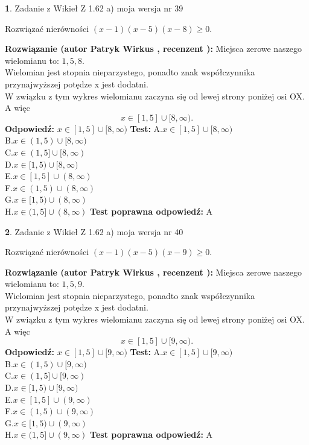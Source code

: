 \documentclass[12pt, a4paper]{article}
\theoremstyle{definition} %
\newtheorem{zad}{}
\newcommand{\zadStart}[1]{\begin{zad}#1\newline}
\newcommand{\zadStop}{\end{zad}}
\newcommand{\rozwStart}[2]{\noindent \textbf{Rozwiązanie (autor #1 , recenzent #2): }\newline}
\newcommand{\rozwStop}{\newline}
\newcommand{\odpStart}{\noindent \textbf{Odpowiedź:}\newline}
\newcommand{\odpStop}{\newline}
\newcommand{\testStart}{\noindent \textbf{Test:}\newline}
\newcommand{\testStop}{\newline}
\newcommand{\kluczStart}{\noindent \textbf{Test poprawna odpowiedź:}\newline}
\newcommand{\kluczStop}{\newline}
\begin{document}
\zadStart{Zadanie z Wikieł Z 1.62 a) moja wersja nr 39}

Rozwiązać nierówności $(x-1)(x-5)(x-8)\ge0$.
\zadStop
\rozwStart{Patryk Wirkus}{}
Miejsca zerowe naszego wielomianu to: $1, 5, 8$.\\
Wielomian jest stopnia nieparzystego, ponadto znak współczynnika przy\linebreak najwyższej potędze x jest dodatni.\\ W związku z tym wykres wielomianu zaczyna się od lewej strony poniżej osi OX. A więc $$x \in [1,5] \cup [8,\infty).$$
\rozwStop
\odpStart
$x \in [1,5] \cup [8,\infty)$
\odpStop
\testStart
A.$x \in [1,5] \cup [8,\infty)$\\
B.$x \in (1,5) \cup [8,\infty)$\\
C.$x \in (1,5] \cup [8,\infty)$\\
D.$x \in [1,5) \cup [8,\infty)$\\
E.$x \in [1,5] \cup (8,\infty)$\\
F.$x \in (1,5) \cup (8,\infty)$\\
G.$x \in [1,5) \cup (8,\infty)$\\
H.$x \in (1,5] \cup (8,\infty)$
\testStop
\kluczStart
A
\kluczStop



\zadStart{Zadanie z Wikieł Z 1.62 a) moja wersja nr 40}

Rozwiązać nierówności $(x-1)(x-5)(x-9)\ge0$.
\zadStop
\rozwStart{Patryk Wirkus}{}
Miejsca zerowe naszego wielomianu to: $1, 5, 9$.\\
Wielomian jest stopnia nieparzystego, ponadto znak współczynnika przy\linebreak najwyższej potędze x jest dodatni.\\ W związku z tym wykres wielomianu zaczyna się od lewej strony poniżej osi OX. A więc $$x \in [1,5] \cup [9,\infty).$$
\rozwStop
\odpStart
$x \in [1,5] \cup [9,\infty)$
\odpStop
\testStart
A.$x \in [1,5] \cup [9,\infty)$\\
B.$x \in (1,5) \cup [9,\infty)$\\
C.$x \in (1,5] \cup [9,\infty)$\\
D.$x \in [1,5) \cup [9,\infty)$\\
E.$x \in [1,5] \cup (9,\infty)$\\
F.$x \in (1,5) \cup (9,\infty)$\\
G.$x \in [1,5) \cup (9,\infty)$\\
H.$x \in (1,5] \cup (9,\infty)$
\testStop
\kluczStart
A
\kluczStop
\end{document}
